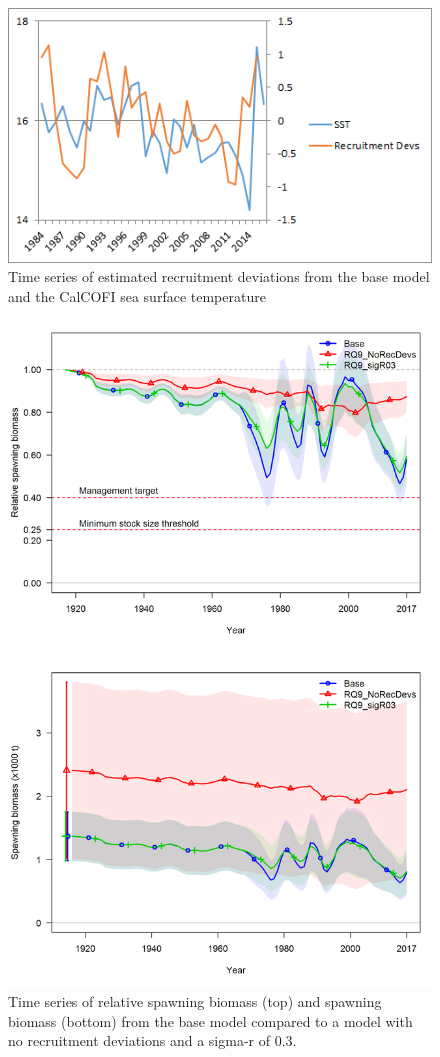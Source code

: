 \documentclass[12pt,]{article}
\begin{document}
\begin{figure}[htbp]
\centering
\includegraphics{Figures/Request8.png}
\caption{Time series of estimated recruitment deviations from the base
model and the CalCOFI sea surface temperature \label{fig:Request8}}
\end{figure}

\begin{figure}[htbp]
\centering
\includegraphics[height=0.90000\textwidth]{Figures/Request9.png}
\caption{Time series of relative spawning biomass (top) and spawning
biomass (bottom) from the base model compared to a model with no
recruitment deviations and a sigma-r of 0.3. \label{fig:Request9}}
\end{figure}
\end{document}
